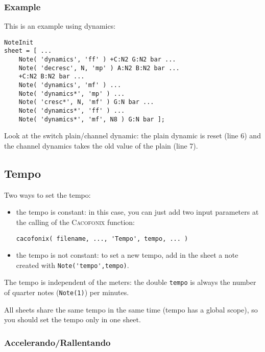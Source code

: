 \documentclass{article}
\newcommand\cacofonix{\textsc{Cacofonix}\xspace}
\newcommand\sfz{s$\!f\!$z\xspace}
\begin{document}
\subsubsection{Example}

This is an example using dynamics: \\

\begin{lstlisting}
NoteInit
sheet = [ ...
	Note( 'dynamics', 'ff' ) +C:N2 G:N2 bar ...
	Note( 'decresc', N, 'mp' ) A:N2 B:N2 bar ...
	+C:N2 B:N2 bar ...
	Note( 'dynamics', 'mf' ) ...
	Note( 'dynamics*', 'mp' ) ...
	Note( 'cresc*', N, 'mf' ) G:N bar ...
	Note( 'dynamics*', 'ff' ) ...
	Note( 'dynamics*', 'mf', N8 ) G:N bar ];
\end{lstlisting}

Look at the switch plain/channel dynamic: the plain dynamic is reset (line 6) and the channel dynamics takes the old value of the plain (line 7).

\subsection{Tempo}
\label{sec:Tempo}

Two ways to set the tempo:
\begin{itemize}
	\item the tempo is constant: in this case, you can just add two input parameters at the calling of the \cacofonix function:
\begin{lstlisting}
cacofonix( filename, ..., 'Tempo', tempo, ... )
\end{lstlisting}
	\item the tempo is not constant: to set a new tempo, add in the sheet a note created with \lstinline!Note('tempo',tempo)!.
\end{itemize}

The tempo is independent of the meters: the double \lstinline!tempo! is always the number of quarter notes (\lstinline!Note(1)!) per minutes.

All sheets share the same tempo in the same time (tempo has a global scope), so you should set the tempo only in one sheet.

\subsubsection{Accelerando/Rallentando}
\label{sec:AccelerandoRallentando}
\end{document}
